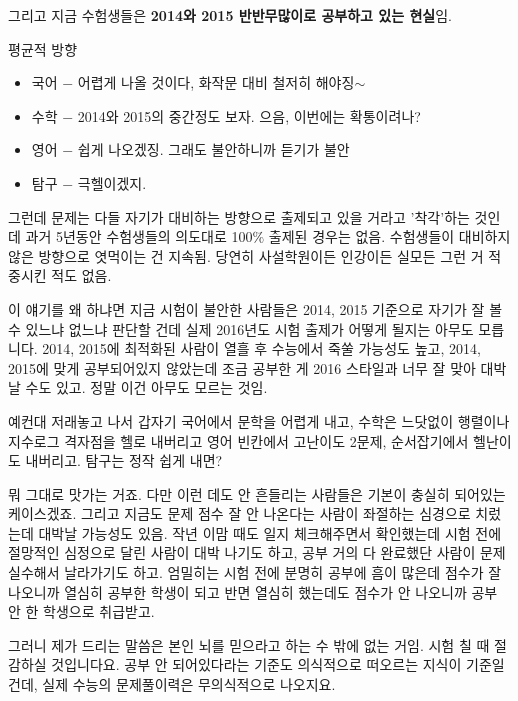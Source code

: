 그리고 지금 수험생들은 \textbf{2014와 2015 반반무많이로 공부하고 있는 현실}임.
\vspace{5mm}

평균적 방향
\vspace{5mm}

\begin{itemize}
    \item 국어 $-$ 어렵게 나올 것이다, 화작문 대비 철저히 해야징$\sim$
    \item 수학 $-$ 2014와 2015의 중간정도 보자. 으음, 이번에는 확통이려나?
    \item 영어 $-$ 쉽게 나오겠징. 그래도 불안하니까 듣기가 불안
    \item 탐구 $-$ 극헬이겠지.
\end{itemize}
\vspace{5mm}

그런데 문제는 다들 자기가 대비하는 방향으로 출제되고 있을 거라고 '착각'하는 것인데
과거 5년동안 수험생들의 의도대로 100$\%$ 출제된 경우는 없음. 수험생들이 대비하지 않은 방향으로 엿먹이는 건 지속됨.
당연히 사설학원이든 인강이든 실모든 그런 거 적중시킨 적도 없음.
\vspace{5mm}

이 얘기를 왜 하냐면 지금 시험이 불안한 사람들은 2014, 2015 기준으로 자기가 잘 볼 수 있느냐 없느냐 판단할 건데
실제 2016년도 시험 출제가 어떻게 될지는 아무도 모릅니다.
2014, 2015에 최적화된 사람이 열흘 후 수능에서 죽쑬 가능성도 높고,
2014, 2015에 맞게 공부되어있지 않았는데 조금 공부한 게 2016 스타일과 너무 잘 맞아 대박날 수도 있고.
정말 이건 아무도 모르는 것임.
\vspace{5mm}

예컨대 저래놓고 나서
갑자기 국어에서 문학을 어렵게 내고,
수학은 느닷없이 행렬이나 지수로그 격자점을 헬로 내버리고
영어 빈칸에서 고난이도 2문제, 순서잡기에서 헬난이도 내버리고. 탐구는 정작 쉽게 내면?
\vspace{5mm}

뭐 그대로 맛가는 거죠. 다만 이런 데도 안 흔들리는 사람들은 기본이 충실히 되어있는 케이스겠죠.
그리고 지금도 문제 점수 잘 안 나온다는 사람이 좌절하는 심경으로 치렀는데 대박날 가능성도 있음.
작년 이맘 때도 일지 체크해주면서 확인했는데 시험 전에 절망적인 심정으로 달린 사람이 대박 나기도 하고,
공부 거의 다 완료했단 사람이 문제 실수해서 날라가기도 하고.
엄밀히는 시험 전에 분명히 공부에 흠이 많은데 점수가 잘 나오니까 열심히 공부한 학생이 되고
반면 열심히 했는데도 점수가 안 나오니까 공부 안 한 학생으로 취급받고.
\vspace{5mm}

그러니 제가 드리는 말씀은 본인 뇌를 믿으라고 하는 수 밖에 없는 거임. 시험 칠 때 절감하실 것입니다요.
공부 안 되어있다라는 기준도 의식적으로 떠오르는 지식이 기준일 건데,
실제 수능의 문제풀이력은 무의식적으로 나오지요.
\vspace{5mm}


